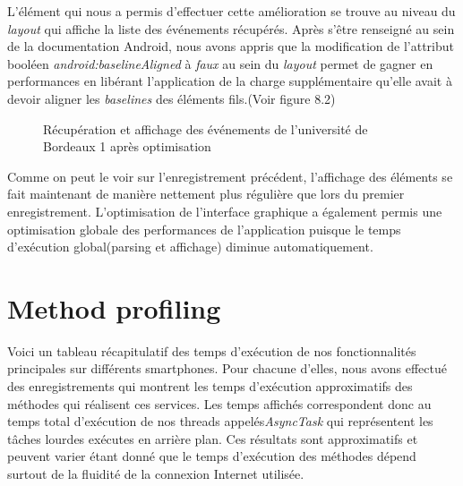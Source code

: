 L'élément qui nous a permis d'effectuer cette amélioration se trouve au niveau du \textit{layout} qui affiche la liste des événements récupérés. Après s'être renseigné au sein de la documentation Android, nous avons appris que la  modification de l'attribut booléen \textit{android:baselineAligned} à \textit{faux} au sein du \textit{layout} permet de gagner en performances en libérant l'application de la charge supplémentaire qu'elle avait à devoir aligner les \textit{baselines} des éléments fils.(Voir figure 8.2)

\begin{figure}[h!]
  \label{fig:systrace_optim}
  \center
  \setlength\fboxsep{5pt}
  \setlength\fboxrule{0.5pt}
  \caption{Récupération et affichage des événements de l'université de Bordeaux 1 après optimisation}
\end{figure}

Comme on peut le voir sur l'enregistrement précédent, l'affichage des éléments se fait maintenant de manière nettement plus régulière que lors du premier enregistrement. L'optimisation de l'interface graphique a également permis une optimisation globale des performances de l'application puisque le temps d'exécution global(parsing et affichage) diminue automatiquement. 

\section{Method profiling}
Voici un tableau récapitulatif des temps d’exécution de nos fonctionnalités principales sur différents smartphones. Pour chacune d'elles, nous avons effectué des enregistrements qui montrent les temps d'exécution approximatifs des méthodes qui réalisent ces services. Les temps affichés correspondent donc au temps total d'exécution de nos threads appelés\textit{AsyncTask} qui représentent les tâches lourdes exécutes en arrière plan. Ces résultats sont approximatifs et peuvent varier étant donné que le temps d’exécution des méthodes dépend surtout de la fluidité de la connexion Internet utilisée.\\

